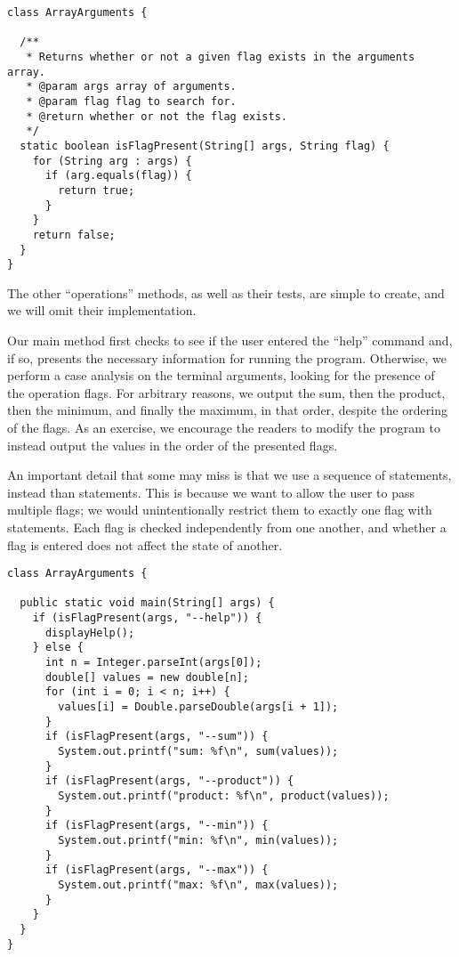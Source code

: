 \begin{lstlisting}[language=MyJava]
class ArrayArguments {

  /**
   * Returns whether or not a given flag exists in the arguments array.
   * @param args array of arguments.
   * @param flag flag to search for.
   * @return whether or not the flag exists.
   */
  static boolean isFlagPresent(String[] args, String flag) {
    for (String arg : args) {
      if (arg.equals(flag)) { 
        return true; 
      }
    }
    return false;
  }
}
\end{lstlisting}

The other ``operations'' methods, as well as their tests, are simple to create, and we will omit their implementation. 

Our main method first checks to see if the user entered the ``help'' command and, if so, presents the necessary information for running the program. 
Otherwise, we perform a case analysis on the terminal arguments, looking for the presence of the operation flags. 
For arbitrary reasons, we output the sum, then the product, then the minimum, and finally the maximum, in that order, despite the ordering of the flags. 
As an exercise, we encourage the readers to modify the program to instead output the values in the order of the presented flags. 

An important detail that some may miss is that we use a sequence of  statements, instead than  statements. 
This is because we want to allow the user to pass multiple flags; we would unintentionally restrict them to exactly one flag with  statements. 
Each flag is checked independently from one another, and whether a flag is entered does not affect the state of another.

\enlargethispage{-6\baselineskip}
\begin{lstlisting}[language=MyJava]
class ArrayArguments {

  public static void main(String[] args) {
    if (isFlagPresent(args, "--help")) {
      displayHelp();
    } else {
      int n = Integer.parseInt(args[0]);
      double[] values = new double[n];
      for (int i = 0; i < n; i++) { 
        values[i] = Double.parseDouble(args[i + 1]); 
      }
      if (isFlagPresent(args, "--sum")) { 
        System.out.printf("sum: %f\n", sum(values)); 
      }
      if (isFlagPresent(args, "--product")) { 
        System.out.printf("product: %f\n", product(values)); 
      }
      if (isFlagPresent(args, "--min")) { 
        System.out.printf("min: %f\n", min(values)); 
      }
      if (isFlagPresent(args, "--max")) { 
        System.out.printf("max: %f\n", max(values)); 
      }
    }
  }
}
\end{lstlisting}

